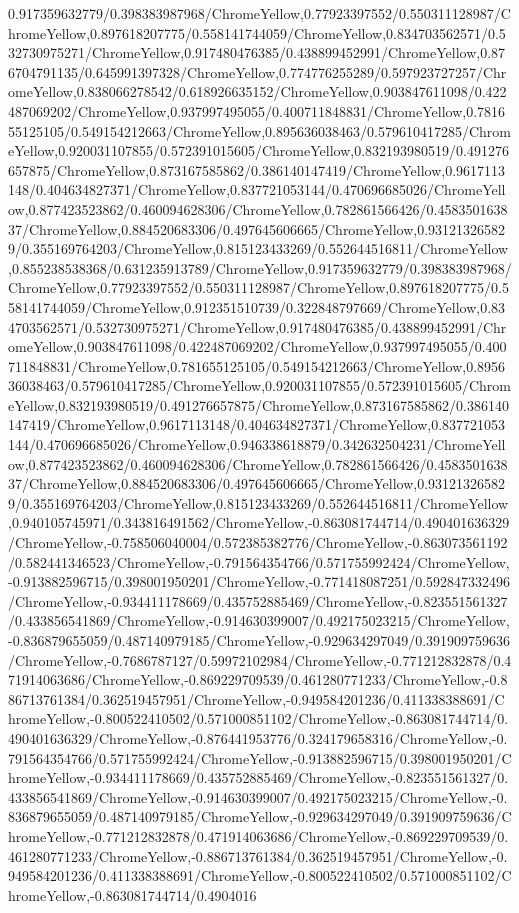 {\begin{tikzternal}
{0.917359632779/0.398383987968/ChromeYellow,0.77923397552/0.550311128987/ChromeYellow,0.897618207775/0.558141744059/ChromeYellow,0.834703562571/0.532730975271/ChromeYellow,0.917480476385/0.438899452991/ChromeYellow,0.876704791135/0.645991397328/ChromeYellow,0.774776255289/0.597923727257/ChromeYellow,0.838066278542/0.618926635152/ChromeYellow,0.903847611098/0.422487069202/ChromeYellow,0.937997495055/0.400711848831/ChromeYellow,0.781655125105/0.549154212663/ChromeYellow,0.895636038463/0.579610417285/ChromeYellow,0.920031107855/0.572391015605/ChromeYellow,0.832193980519/0.491276657875/ChromeYellow,0.873167585862/0.386140147419/ChromeYellow,0.9617113148/0.404634827371/ChromeYellow,0.837721053144/0.470696685026/ChromeYellow,0.877423523862/0.460094628306/ChromeYellow,0.782861566426/0.458350163837/ChromeYellow,0.884520683306/0.497645606665/ChromeYellow,0.931213265829/0.355169764203/ChromeYellow,0.815123433269/0.552644516811/ChromeYellow,0.855238538368/0.631235913789/ChromeYellow,0.917359632779/0.398383987968/ChromeYellow,0.77923397552/0.550311128987/ChromeYellow,0.897618207775/0.558141744059/ChromeYellow,0.912351510739/0.322848797669/ChromeYellow,0.834703562571/0.532730975271/ChromeYellow,0.917480476385/0.438899452991/ChromeYellow,0.903847611098/0.422487069202/ChromeYellow,0.937997495055/0.400711848831/ChromeYellow,0.781655125105/0.549154212663/ChromeYellow,0.895636038463/0.579610417285/ChromeYellow,0.920031107855/0.572391015605/ChromeYellow,0.832193980519/0.491276657875/ChromeYellow,0.873167585862/0.386140147419/ChromeYellow,0.9617113148/0.404634827371/ChromeYellow,0.837721053144/0.470696685026/ChromeYellow,0.946338618879/0.342632504231/ChromeYellow,0.877423523862/0.460094628306/ChromeYellow,0.782861566426/0.458350163837/ChromeYellow,0.884520683306/0.497645606665/ChromeYellow,0.931213265829/0.355169764203/ChromeYellow,0.815123433269/0.552644516811/ChromeYellow,0.940105745971/0.343816491562/ChromeYellow,-0.863081744714/0.490401636329/ChromeYellow,-0.758506040004/0.572385382776/ChromeYellow,-0.863073561192/0.582441346523/ChromeYellow,-0.791564354766/0.571755992424/ChromeYellow,-0.913882596715/0.398001950201/ChromeYellow,-0.771418087251/0.592847332496/ChromeYellow,-0.934411178669/0.435752885469/ChromeYellow,-0.823551561327/0.433856541869/ChromeYellow,-0.914630399007/0.492175023215/ChromeYellow,-0.836879655059/0.487140979185/ChromeYellow,-0.929634297049/0.391909759636/ChromeYellow,-0.7686787127/0.59972102984/ChromeYellow,-0.771212832878/0.471914063686/ChromeYellow,-0.869229709539/0.461280771233/ChromeYellow,-0.886713761384/0.362519457951/ChromeYellow,-0.949584201236/0.411338388691/ChromeYellow,-0.800522410502/0.571000851102/ChromeYellow,-0.863081744714/0.490401636329/ChromeYellow,-0.876441953776/0.324179658316/ChromeYellow,-0.791564354766/0.571755992424/ChromeYellow,-0.913882596715/0.398001950201/ChromeYellow,-0.934411178669/0.435752885469/ChromeYellow,-0.823551561327/0.433856541869/ChromeYellow,-0.914630399007/0.492175023215/ChromeYellow,-0.836879655059/0.487140979185/ChromeYellow,-0.929634297049/0.391909759636/ChromeYellow,-0.771212832878/0.471914063686/ChromeYellow,-0.869229709539/0.461280771233/ChromeYellow,-0.886713761384/0.362519457951/ChromeYellow,-0.949584201236/0.411338388691/ChromeYellow,-0.800522410502/0.571000851102/ChromeYellow,-0.863081744714/0.4904016}
\end{tikzternal}}
